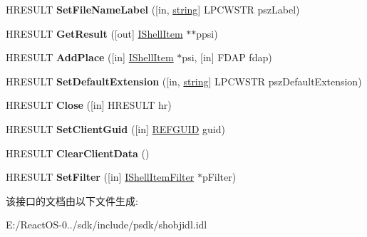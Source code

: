\begin{DoxyCompactItemize}
\mbox{\label{interface_i_file_dialog_a605c3eee7016202f3ac04532dda0fd31}} 
H\+R\+E\+S\+U\+LT {\bfseries Set\+File\+Name\+Label} (\mbox{[}in, \hyperlink{structstring}{string}\mbox{]} L\+P\+C\+W\+S\+TR psz\+Label)
\item 
\mbox{\label{interface_i_file_dialog_a2b255e4fea4990d2fb6b56bb8fdd866e}} 
H\+R\+E\+S\+U\+LT {\bfseries Get\+Result} (\mbox{[}out\mbox{]} \hyperlink{interface_i_shell_item}{I\+Shell\+Item} $\ast$$\ast$ppsi)
\item 
\mbox{\label{interface_i_file_dialog_a29bd7853a500245d4d9763e58ea410ea}} 
H\+R\+E\+S\+U\+LT {\bfseries Add\+Place} (\mbox{[}in\mbox{]} \hyperlink{interface_i_shell_item}{I\+Shell\+Item} $\ast$psi, \mbox{[}in\mbox{]} F\+D\+AP fdap)
\item 
\mbox{\label{interface_i_file_dialog_a9c560d8e171fa6628e9802937264a0ad}} 
H\+R\+E\+S\+U\+LT {\bfseries Set\+Default\+Extension} (\mbox{[}in, \hyperlink{structstring}{string}\mbox{]} L\+P\+C\+W\+S\+TR psz\+Default\+Extension)
\item 
\mbox{\label{interface_i_file_dialog_af9bab1d95ccf62d2712883111a9c1d21}} 
H\+R\+E\+S\+U\+LT {\bfseries Close} (\mbox{[}in\mbox{]} H\+R\+E\+S\+U\+LT hr)
\item 
\mbox{\label{interface_i_file_dialog_a25256ca4427a60ad5f73bf70047c59c5}} 
H\+R\+E\+S\+U\+LT {\bfseries Set\+Client\+Guid} (\mbox{[}in\mbox{]} \hyperlink{struct___g_u_i_d}{R\+E\+F\+G\+U\+ID} guid)
\item 
\mbox{\label{interface_i_file_dialog_ab946827d6573a3136f58df55d9550bd1}} 
H\+R\+E\+S\+U\+LT {\bfseries Clear\+Client\+Data} ()
\item 
\mbox{\label{interface_i_file_dialog_aa9a2900aeb420056e7942157a7a9c679}} 
H\+R\+E\+S\+U\+LT {\bfseries Set\+Filter} (\mbox{[}in\mbox{]} \hyperlink{interface_i_shell_item_filter}{I\+Shell\+Item\+Filter} $\ast$p\+Filter)
\end{DoxyCompactItemize}


该接口的文档由以下文件生成\+:\begin{DoxyCompactItemize}
\item 
E\+:/\+React\+O\+S-\/0../sdk/include/psdk/shobjidl.\+idl\end{DoxyCompactItemize}
